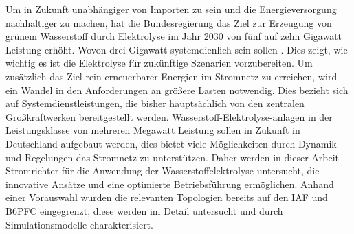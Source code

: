 Um in Zukunft unabhängiger von Importen zu sein und die Energieversorgung nachhaltiger zu machen, hat die Bundesregierung das Ziel zur Erzeugung von grünem Wasserstoff durch Elektrolyse im Jahr 2030 von fünf auf zehn Gigawatt Leistung erhöht. Wovon drei Gigawatt systemdienlich sein sollen \cite{BMWKH2}. Dies zeigt, wie wichtig es ist die Elektrolyse für zukünftige Szenarien vorzubereiten.
Um zusätzlich das Ziel rein erneuerbarer Energien im Stromnetz zu erreichen, wird ein Wandel in den Anforderungen an größere Lasten notwendig. Dies bezieht sich auf Systemdienstleistungen, die bisher hauptsächlich von den zentralen Großkraftwerken bereitgestellt werden. Wasserstoff-Elektrolyse-anlagen in der Leistungsklasse von mehreren Megawatt Leistung sollen in Zukunft in Deutschland aufgebaut werden, dies bietet viele Möglichkeiten durch Dynamik und Regelungen das Stromnetz zu unterstützen. Daher werden in dieser Arbeit Stromrichter für die Anwendung der Wasserstoffelektrolyse untersucht, die innovative Ansätze und eine optimierte Betriebsführung ermöglichen. Anhand einer Vorauswahl wurden die relevanten Topologien bereits auf den \gls{IAF} und \gls{B6PFC} eingegrenzt, diese werden im Detail untersucht und durch Simulationsmodelle charakterisiert.
